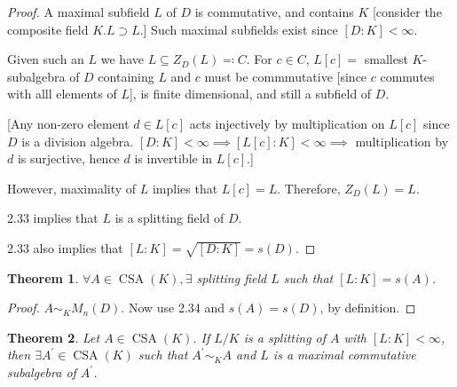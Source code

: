\documentclass{article}
\theoremstyle{definition}
\theoremstyle{plain}
\newtheorem{theorem}{Theorem}[section]
\theoremstyle{remark}
\begin{document}
    \begin{proof}
        A maximal subfield \(L\) of \(D\) is commutative, and contains \(K\) [consider the composite field \(K . L \supset L\).] Such maximal subfields exist since \([D:K] < \infty\).

        Given such an \(L\) we have \(L \subseteq Z_D(L) \eqqcolon C\). For \(c\in C\), \(L[c] =\) smallest \(K\)-subalgebra of \(D\) containing \(L\) and \(c\) must be commmutative [since \(c\) commutes with alll elements of \(L\)], is finite dimensional, and still a subfield of \(D\).

        [Any non-zero element \(d \in L[c]\) acts injectively by multiplication on \(L[c]\) since \(D\) is a division algebra. \([D:K] < \infty \implies [L[c] : K] < \infty \implies\) multiplication by \(d\) is surjective, hence \(d\) is invertible in \(L[c]\).]

        However, maximality of \(L\) implies that \(L[c] = L\). Therefore, \(Z_D(L) = L\).

        2.33 implies that \(L\) is a splitting field of \(D\).

        2.33 also implies that \([L:K] = \sqrt{[D:K]} = s(D)\). 

    \end{proof}

    \begin{theorem}
        \(\forall A \in \operatorname{CSA}(K), \exists\) splitting field \(L\) such that \([L:K] = s(A)\).
    \end{theorem}

    \begin{proof}
        \(A \sim_K M_n(D)\). Now use 2.34 and \(s(A) = s(D)\), by definition.
    \end{proof}

    \begin{theorem}
        Let \(A \in \operatorname{CSA}(K)\). If \(L / K\) is a splitting of \(A\) with \([L : K] < \infty\), then \(\exists A^{\prime} \in \operatorname{CSA}(K)\) such that \(A^{\prime} \sim_K A\) and \(L\) is a maximal commutative subalgebra of \(A^{\prime}\).
    \end{theorem}
\end{document}
